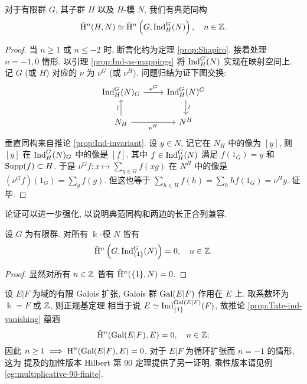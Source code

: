 \begin{proposition}
	对于有限群 $G$, 其子群 $H$ 以及 $H$-模 $N$, 我们有典范同构
	\[ \hat{\mathrm{H}}^n(H, N) \simeq \hat{\mathrm{H}}^n\left( G, \operatorname{Ind}^G_H(N)\right), \quad n \in \mathbb{Z}. \]
\end{proposition}
\begin{proof}
	当 $n \geq 1$ 或 $n \leq -2$ 时, 断言化约为定理 \ref{prop:Shapiro}. 接着处理 $n = -1, 0$ 情形. 以引理 \ref{prop:Ind-as-mappings} 将 $\operatorname{Ind}^G_H(N)$ 实现在映射空间上. 记 $G$ (或 $H$) 对应的 $\nu$ 为 $\nu^G$ (或 $\nu^H$). 问题归结为证下图交换:
	\[\begin{tikzcd}
		\Ind^G_H(N)_G \arrow[r, "{\nu^G}"] & \Ind^G_H(N)^G \arrow[d, "\sim" sloped] \\
		N_H \arrow[u, "\sim" sloped] \arrow[r, "{\nu^H}"'] & N^H
	\end{tikzcd}\]
	垂直同构来自推论 \ref{prop:Ind-invariant}. 设 $y \in N$, 记它在 $N_H$ 中的像为 $[y]$, 则 $[y]$ 在 $\operatorname{Ind}^G_H(N)_G$ 中的像是 $[f]$, 其中 $f \in \operatorname{Ind}^G_H(N)$ 满足 $f(1_G) = y$ 和 $\operatorname{Supp}(f) \subset H$. 于是 $\nu^G f: x \mapsto \sum_{g \in G} f(xg)$ 在 $N^H$ 中的像是 $(\nu^G f)(1_G) = \sum_g f(g)$. 但这也等于 $\sum_{h \in H} f(h) = \sum_h hf(1_G) = \nu^H y$. 证毕.
\end{proof}

论证可以进一步强化, 以说明典范同构和两边的长正合列兼容.

\begin{corollary}\label{prop:Tate-ind-vanishing}
	设 $G$ 为有限群. 对所有 $\Bbbk$-模 $N$ 皆有
	\[ \hat{\mathrm{H}}^n\left(G, \operatorname{Ind}^G_{\{1\}}(N)\right) = 0, \quad n \in \mathbb{Z}. \]
\end{corollary}
\begin{proof}
	显然对所有 $n \in \mathbb{Z}$ 皆有 $\hat{\mathrm{H}}^n(\{1\}, N) = 0$.
\end{proof}

\begin{example}\label{eg:additive-90-finite}
	设 $E|F$ 为域的有限 Galois 扩张, Galois 群 $\operatorname{Gal}(E|F)$ 作用在 $E$ 上. 取系数环为 $\Bbbk = F$ 或 $\mathbb{Z}$, 则正规基定理 \cite[定理 9.5.6]{Li1} 相当于说 $E \simeq \operatorname{Ind}^{\operatorname{Gal}(E|F)}_{\{1\}}(F)$, 故推论 \ref{prop:Tate-ind-vanishing} 蕴涵
	\[ \hat{\mathrm{H}}^n(\operatorname{Gal}(E|F), E) = 0, \quad n \in \mathbb{Z}; \]
	因此 $n \geq 1 \implies \operatorname{H}^n(\operatorname{Gal}(E|F), E) = 0$. 对于 $E|F$ 为循环扩张而 $n = -1$ 的情形, 这为 \cite[定理 9.6.10]{Li1} 提及的加性版本 Hilbert 第 90 定理提供了另一证明. 乘性版本请见例 \ref{eg:multiplicative-90-finite}.
\end{example}

